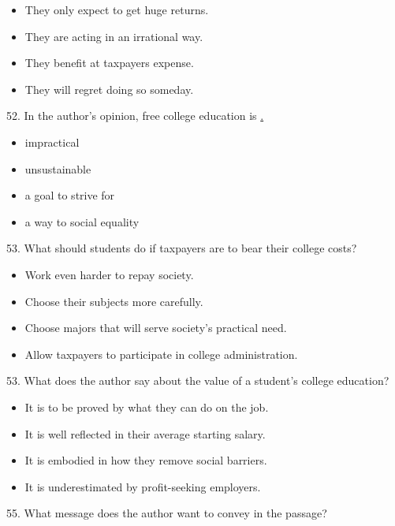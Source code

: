 \documentclass[UTF8,11pt]{ctexart}
\begin{document}
\begin{itemize}[leftmargin=2em,itemsep=.2em,topsep=.4em]\item[A.] They only expect to get huge returns.
\item[B.] They are acting in an irrational way.
\item[C.] They benefit at taxpayers expense.
\item[D.] They will regret doing so someday.
\end{itemize}

52. In the author's opinion, free college education is \uline{.}


\begin{itemize}[leftmargin=2em,itemsep=.2em,topsep=.4em]\item[A.] impractical
\item[B.] unsustainable
\item[C.] a goal to strive for
\item[D.] a way to social equality
\end{itemize}

53. What should students do if taxpayers are to bear their college costs?


\begin{itemize}[leftmargin=2em,itemsep=.2em,topsep=.4em]\item[A.] Work even harder to repay society.
\item[B.] Choose their subjects more carefully.
\item[C.] Choose majors that will serve society's practical need.
\item[D.] Allow taxpayers to participate in college administration.
\end{itemize}

53. What does the author say about the value of a student's college education?


\begin{itemize}[leftmargin=2em,itemsep=.2em,topsep=.4em]\item[B.] It is to be proved by what they can do on the job.
\item[C.] It is well reflected in their average starting salary.
\item[D.] It is embodied in how they remove social barriers.
\item[E.] It is underestimated by profit-seeking employers.
\end{itemize}

55. What message does the author want to convey in the passage?
\end{document}
